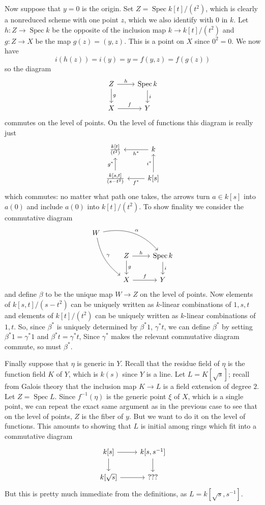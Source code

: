 \documentclass[10pt]{article}
\newcommand{\Spec}{\operatorname{Spec}}
\theoremstyle{definition}
\begin{document}
Now suppose that $y = 0$ is the origin.
Set $Z = \Spec k[t]/(t^2)$, which is clearly a nonreduced scheme with one point $z$, which we also identify with $0$ in $k$.
Let $h: Z \to \Spec k$ be the opposite of the inclusion map $k \to k[t]/(t^2)$ and $g: Z \to X$ be the map $g(z) = (y, z)$.
This is a point on $X$ since $0^2 = 0$.
We now have
$$i(h(z)) = i(y) = y = f(y, z) = f(g(z))$$
so the diagram
$$\begin{tikzcd}
Z \arrow[r, "h"] \arrow[d,"g"] & \Spec k \arrow[d,"i"] \\
X \arrow[r,"f"] & Y
\end{tikzcd}
$$
commutes on the level of points. On the level of functions this diagram is really just
$$
\begin{tikzcd}
\frac{k[t]}{(t^2)} & k \arrow[l, "h^*"] \\
\frac{k[s, t]}{(s - t^2)} \arrow[u, "g^*"] & k[s] \arrow[u, "i^*"] \arrow[l, "f^*"]
\end{tikzcd}
$$
which commutes: no matter what path one takes, the arrows turn $a \in k[s]$ into $a(0)$ and include $a(0)$ into $k[t]/(t^2)$.
To show finality we consider the commutative diagram
$$\begin{tikzcd} W \arrow[drr,bend left=30,"\alpha"] \arrow[ddr,bend right=20,"\gamma"] \\
& Z \arrow[r,"h"] \arrow[d,"g"] & \Spec k \arrow[d,"i"] \\
& X \arrow[r,"f"] & Y\end{tikzcd}$$
and define $\beta$ to be the unique map $W \to Z$ on the level of points.
Now elements of $k[s, t]/(s - t^2)$ can be uniquely written as $k$-linear combinations of $1,s,t$ and elements of $k[t]/(t^2)$ can be uniquely written as $k$-linear combinations of $1,t$.
So, since $\beta^*$ is uniquely determined by $\beta^* 1$, $\gamma^* t$, we can define $\beta^*$ by setting $\beta^* 1 = \gamma^* 1$ and $\beta^* t = \gamma^* t$,
Since $\gamma^*$ makes the relevant commutative diagram commute, so must $\beta^*$.

Finally suppose that $\eta$ is generic in $Y$.
Recall that the residue field of $\eta$ is the function field $K$ of $Y$, which is $k(s)$ since $Y$ is a line.
Let $L = K[\sqrt s]$; recall from Galois theory that the inclusion map $K \to L$ is a field extension of degree $2$.
Let $Z = \Spec L$.
Since $f^{-1}(\eta)$ is the generic point $\xi$ of $X$, which is a single point, we can repeat the exact same argument as in the previous case to see that on the level of points, $Z$ is the fiber of $y$.
But we want to do it on the level of functions.
This amounts to showing that $L$ is initial among rings which fit into a commutative diagram
$$\begin{tikzcd}
k[s] \arrow[r] \arrow[d] & k[s, s^{-1}] \arrow[d] \\
k[\sqrt s] \arrow[r] & ???
\end{tikzcd}$$
But this is pretty much immediate from the definitions, as $L = k[\sqrt s, s^{-1}]$.
\end{document}
